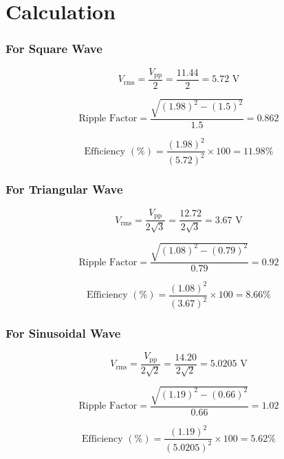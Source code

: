 \section{Calculation}

\subsubsection{For Square Wave}
\begin{equation}
  V_{\text{rms}} = \frac{V_{\text{pp}}}{2} = \frac{11.44}{2} = 5.72\text{ V}
\end{equation}

\begin{equation}
  \text{Ripple Factor} = \frac{\sqrt{(1.98)^2 - (1.5)^2}}{1.5} = \boxed{0.862}
\end{equation}

\begin{equation}
  \text{Efficiency } (\%) = \frac{(1.98)^2}{(5.72)^2} \times 100 = \boxed{11.98\%}
\end{equation}

\subsubsection{For Triangular Wave}
\begin{equation}
  V_{\text{rms}} = \frac{V_{\text{pp}}}{2\sqrt{3}} = \frac{12.72}{2\sqrt{3}} = 3.67\text{ V}
\end{equation}

\begin{equation}
  \text{Ripple Factor} = \frac{\sqrt{(1.08)^2 - (0.79)^2}}{0.79} = \boxed{0.92}
\end{equation}

\begin{equation}
  \text{Efficiency } (\%) = \frac{(1.08)^2}{(3.67)^2} \times 100 = \boxed{8.66\%}
\end{equation}

\subsubsection{For Sinusoidal Wave}
\begin{equation}
  V_{\text{rms}} = \frac{V_{\text{pp}}}{2\sqrt{2}} = \frac{14.20}{2\sqrt{2}} = 5.0205\text{ V}
\end{equation}

\begin{equation}
  \text{Ripple Factor} = \frac{\sqrt{(1.19)^2 - (0.66)^2}}{0.66} = \boxed{1.02}
\end{equation}

\begin{equation}
  \text{Efficiency } (\%) = \frac{(1.19)^2}{(5.0205)^2} \times 100 = \boxed{5.62\%}
\end{equation}

